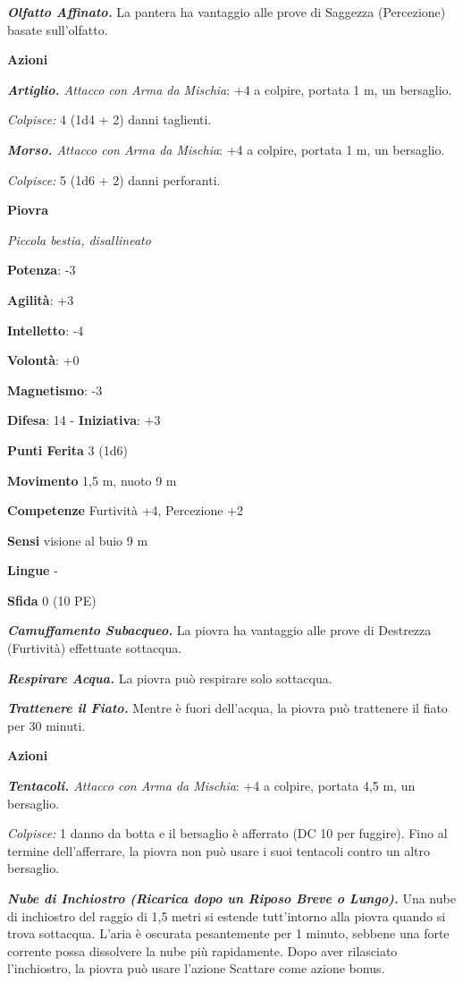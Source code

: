 \begin{multicols}{2}
\emph{\textbf{Olfatto Affinato.}} La pantera ha vantaggio alle prove di
Saggezza (Percezione) basate sull'olfatto.

\smallskip\textbf{Azioni}

\emph{\textbf{Artiglio.} Attacco con Arma da Mischia}: +4 a colpire,
portata 1 m, un bersaglio.

\emph{Colpisce:} 4 (1d4 + 2) danni taglienti.

\emph{\textbf{Morso.} Attacco con Arma da Mischia}: +4 a colpire,
portata 1 m, un bersaglio.

\emph{Colpisce:} 5 (1d6 + 2) danni perforanti.



\textbf{Piovra}

\emph{Piccola bestia, disallineato}

\textbf{Potenza}: -3

\textbf{Agilità}: +3

\textbf{Intelletto}: -4

\textbf{Volontà}: +0

\textbf{Magnetismo}: -3

\textbf{Difesa}: 14 - \textbf{Iniziativa}: +3

\textbf{Punti Ferita} 3 (1d6)

\textbf{Movimento} 1,5 m, nuoto 9 m

\textbf{Competenze} Furtività +4, Percezione +2

\textbf{Sensi} visione al buio 9 m

\textbf{Lingue} -

\textbf{Sfida} 0 (10 PE)\smallskip

\emph{\textbf{Camuffamento Subacqueo.}} La piovra ha vantaggio alle
prove di Destrezza (Furtività) effettuate sottacqua.

\emph{\textbf{Respirare Acqua.}} La piovra può respirare solo sottacqua.

\emph{\textbf{Trattenere il Fiato.}} Mentre è fuori dell'acqua, la
piovra può trattenere il fiato per 30 minuti.

\smallskip\textbf{Azioni}

\emph{\textbf{Tentacoli.} Attacco con Arma da Mischia}: +4 a colpire,
portata 4,5 m, un bersaglio.

\emph{Colpisce:} 1 danno da botta e il bersaglio è afferrato (DC 10
per fuggire). Fino al termine dell'afferrare, la piovra non può usare i
suoi tentacoli contro un altro bersaglio.

\emph{\textbf{Nube di Inchiostro (Ricarica dopo un Riposo Breve o
Lungo).}} Una nube di inchiostro del raggio di 1,5 metri si estende
tutt'intorno alla piovra quando si trova sottacqua. L'aria è oscurata
pesantemente per 1 minuto, sebbene una forte corrente possa dissolvere
la nube più rapidamente. Dopo aver rilasciato l'inchiostro, la piovra
può usare l'azione Scattare come azione bonus.


\end{multicols}
